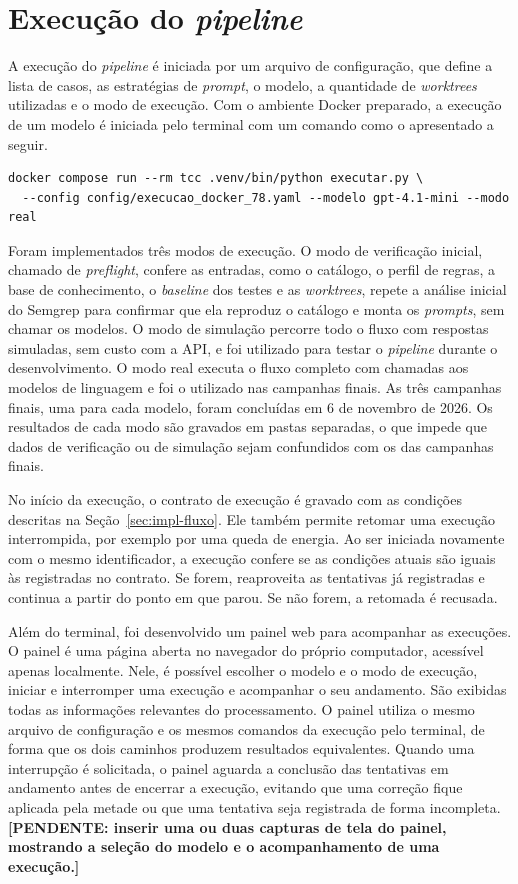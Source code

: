 \section{Execução do \textit{pipeline}}
\label{sec:impl-execucao}

A execução do \textit{pipeline} é iniciada por um arquivo de configuração, que define a lista de casos, as estratégias de \textit{prompt}, o modelo, a quantidade de \textit{worktrees} utilizadas e o modo de execução. Com o ambiente Docker preparado, a execução de um modelo é iniciada pelo terminal com um comando como o apresentado a seguir.

{\footnotesize
\begin{verbatim}
docker compose run --rm tcc .venv/bin/python executar.py \
  --config config/execucao_docker_78.yaml --modelo gpt-4.1-mini --modo real
\end{verbatim}
}

Foram implementados três modos de execução. O modo de verificação inicial, chamado de \textit{preflight}, confere as entradas, como o catálogo, o perfil de regras, a base de conhecimento, o \textit{baseline} dos testes e as \textit{worktrees}, repete a análise inicial do Semgrep para confirmar que ela reproduz o catálogo e monta os \textit{prompts}, sem chamar os modelos. O modo de simulação percorre todo o fluxo com respostas simuladas, sem custo com a API, e foi utilizado para testar o \textit{pipeline} durante o desenvolvimento. O modo real executa o fluxo completo com chamadas aos modelos de linguagem e foi o utilizado nas campanhas finais. As três campanhas finais, uma para cada modelo, foram concluídas em 6 de novembro de 2026. Os resultados de cada modo são gravados em pastas separadas, o que impede que dados de verificação ou de simulação sejam confundidos com os das campanhas finais.

No início da execução, o contrato de execução é gravado com as condições descritas na Seção~\ref{sec:impl-fluxo}. Ele também permite retomar uma execução interrompida, por exemplo por uma queda de energia. Ao ser iniciada novamente com o mesmo identificador, a execução confere se as condições atuais são iguais às registradas no contrato. Se forem, reaproveita as tentativas já registradas e continua a partir do ponto em que parou. Se não forem, a retomada é recusada.

Além do terminal, foi desenvolvido um painel web para acompanhar as execuções. O painel é uma página aberta no navegador do próprio computador, acessível apenas localmente. Nele, é possível escolher o modelo e o modo de execução, iniciar e interromper uma execução e acompanhar o seu andamento. São exibidas todas as informações relevantes do processamento. O painel utiliza o mesmo arquivo de configuração e os mesmos comandos da execução pelo terminal, de forma que os dois caminhos produzem resultados equivalentes. Quando uma interrupção é solicitada, o painel aguarda a conclusão das tentativas em andamento antes de encerrar a execução, evitando que uma correção fique aplicada pela metade ou que uma tentativa seja registrada de forma incompleta. \textbf{[PENDENTE: inserir uma ou duas capturas de tela do painel, mostrando a seleção do modelo e o acompanhamento de uma execução.]}
